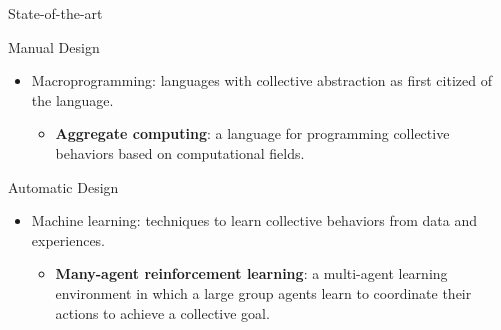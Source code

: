 \documentclass[presentation, 8pt,169]{beamer}\mode<presentation>{\usetheme{AMSBolognaFC}}
\begin{document}
\begin{frame}{State-of-the-art}
  \begin{exampleblock}{Manual Design}
    \begin{itemize}
    \item Macroprogramming: languages with collective abstraction as first citized of the language.
    \begin{itemize}
      \item \textbf{Aggregate computing}: a language for programming collective behaviors based on computational fields.
    \end{itemize}
  \end{itemize}
  \end{exampleblock}
  \begin{exampleblock}{Automatic Design}
  \begin{itemize}
    \item Machine learning: techniques to learn collective behaviors from data and experiences.
    \begin{itemize}
      \item \textbf{Many-agent reinforcement learning}: a multi-agent learning environment in which a large group agents learn to coordinate their actions to achieve a collective goal.
    \end{itemize}
  \end{itemize}
  \end{exampleblock}
\end{frame}
\end{document}
